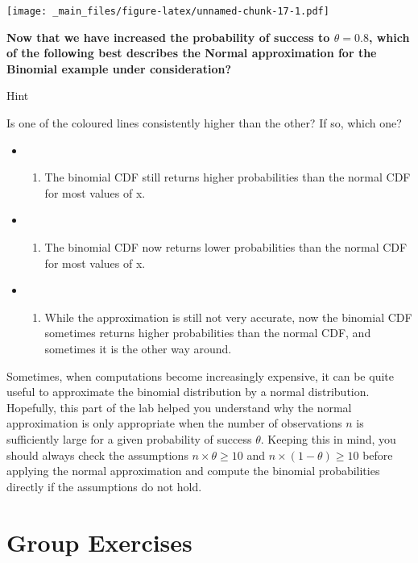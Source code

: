 \documentclass[
]{book}
\providecommand{\tightlist}{%
  \setlength{\itemsep}{0pt}\setlength{\parskip}{0pt}}
\begin{document}
\texttt{[image: \_main\_files/figure-latex/unnamed-chunk-17-1.pdf]}

\textbf{Now that we have increased the probability of success to \(\theta=0.8\), which of the following best describes the Normal approximation for the Binomial example under consideration?}

Hint

Is one of the coloured lines consistently higher than the other? If so, which one?

\begin{itemize}
\item
  \begin{enumerate}
  \def\labelenumi{(\Alph{enumi})}
  \tightlist
  \item
    The binomial CDF still returns higher probabilities than the normal CDF for most values of x.\\
  \end{enumerate}
\item
  \begin{enumerate}
  \def\labelenumi{(\Alph{enumi})}
  \setcounter{enumi}{1}
  \tightlist
  \item
    The binomial CDF now returns lower probabilities than the normal CDF for most values of x.\\
  \end{enumerate}
\item
  \begin{enumerate}
  \def\labelenumi{(\Alph{enumi})}
  \setcounter{enumi}{2}
  \tightlist
  \item
    While the approximation is still not very accurate, now the binomial CDF sometimes returns higher probabilities than the normal CDF, and sometimes it is the other way around.
  \end{enumerate}
\end{itemize}

Sometimes, when computations become increasingly expensive, it can be quite useful to approximate the binomial distribution by a normal distribution. Hopefully, this part of the lab helped you understand why the normal approximation is only appropriate when the number of observations \(n\) is sufficiently large for a given probability of success \(\theta\). Keeping this in mind, you should always check the assumptions \(n \times \theta \geq 10\) and \(n \times (1-\theta) \geq 10\) before applying the normal approximation and compute the binomial probabilities directly if the assumptions do not hold.

\hypertarget{group-exercises}{%
\chapter{Group Exercises}\label{group-exercises}}
\end{document}
